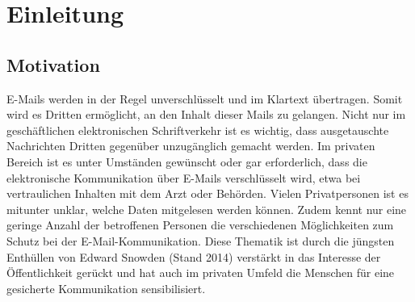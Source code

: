 \documentclass  [paper=a4,
				fontsize=12pt,
				listof=totoc,
				bibliography=totoc
				]{scrreprt}
\begin{document}
	\parindent 0pt %
	
	\pagebreak	%
  \pagestyle{plain}
\begin{small}
  \tableofcontents
	\listoffigures %
	\pagebreak
	\listoftables %
	\pagebreak
	\pagebreak
\end{small}
	\setcounter{page}{1} %
		\pagestyle{fancyplain}
		\fancyhf{}							%
		\renewcommand{\headrulewidth}{0.4pt}
		\footskip =30pt
		\renewcommand{\chaptermark}[1]{\markboth{#1}{}}	%
		\rhead{\nouppercase{\leftmark}}	
		\lfoot{\today}
		\cfoot{\thepage\ / \pageref{LastPage}}

\chapter{Einleitung}
		\section{Motivation}
		E-Mails werden in der Regel unverschlüsselt und im Klartext übertragen. Somit wird es Dritten ermöglicht, an den Inhalt dieser Mails zu gelangen. Nicht nur im geschäftlichen elektronischen Schriftverkehr ist es wichtig, dass ausgetauschte Nachrichten Dritten gegenüber unzugänglich gemacht werden. Im privaten Bereich ist es unter Umständen gewünscht oder gar erforderlich, dass die elektronische Kommunikation über E-Mails verschlüsselt wird, etwa bei vertraulichen Inhalten mit dem Arzt oder Behörden. Vielen Privatpersonen ist es mitunter unklar, welche Daten mitgelesen werden können. Zudem kennt nur eine geringe Anzahl der betroffenen Personen die verschiedenen Möglichkeiten zum Schutz bei der E-Mail-Kommunikation. Diese Thematik ist durch die jüngsten Enthüllen von Edward Snowden (Stand 2014) verstärkt in das Interesse der Öffentlichkeit gerückt und hat auch im privaten Umfeld die Menschen für eine gesicherte Kommunikation sensibilisiert.
		
\end{document}
